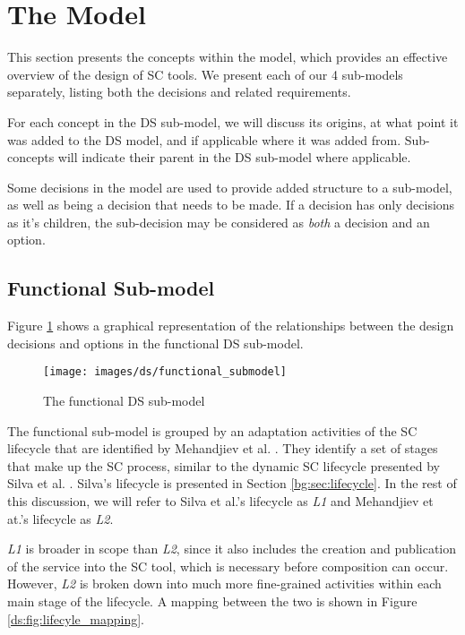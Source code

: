 
\section{The Model}
\label{sec:ds:model}

This section presents the concepts within the model, which provides an effective overview of the design of SC tools. We present each of our 4 sub-models separately, listing both the decisions and related requirements.

For each concept in the DS sub-model, we will discuss its origins, at what point it was added to the DS model, and if applicable where it was added from. Sub-concepts will indicate their parent in the DS sub-model where applicable. 

Some decisions in the model are used to provide added structure to a sub-model, as well as being a decision that needs to be made. If a decision has only decisions as it's children, the sub-decision may be considered as \emph{both} a decision and an option.

\subsection{Functional Sub-model}

Figure \ref{ds:fig:functional} shows a graphical representation of the relationships between the design decisions and options in the functional DS sub-model.

\begin{figure}[htb]
	\centering
	\texttt{[image: images/ds/functional\_submodel]}
	\caption{The functional DS sub-model}
	\label{ds:fig:functional}
\end{figure}

\clearpage

The functional sub-model is grouped by an adaptation activities of the SC lifecycle that are identified by Mehandjiev et al. \cite{Mehandjiev2012}. They identify a set of stages that make up the SC process, similar to the dynamic SC lifecycle presented by Silva et al. \cite{Silva2008}. Silva's lifecycle is presented in Section \ref{bg:sec:lifecycle}. In the rest of this discussion, we will refer to Silva et al.'s lifecycle as \emph{L1} and Mehandjiev et at.'s lifecycle as \emph{L2}.


\emph{L1} is broader in scope than \emph{L2}, since it also includes the creation and publication of the service into the SC tool, which is necessary before composition can occur. However, \emph{L2} is broken down into much more fine-grained activities within each main stage of the lifecycle. A mapping between the two is shown in Figure \ref{ds:fig:lifecyle_mapping}.

